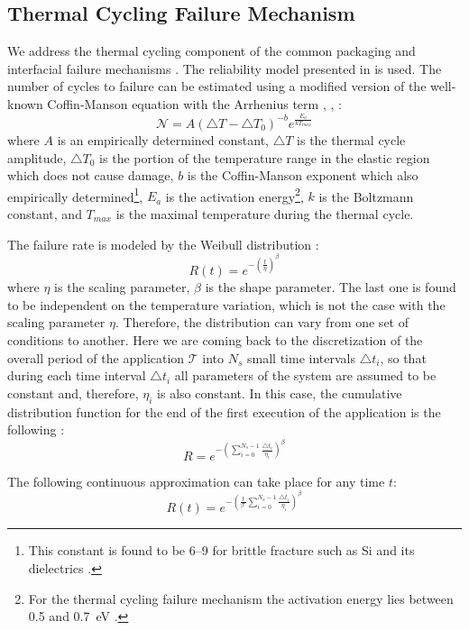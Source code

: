 \subsection{Thermal Cycling Failure Mechanism}
We address the thermal cycling component of the common packaging and interfacial failure mechanisms \cite{jedec2010}. The reliability model presented in \cite{xiang2010} is used. The number of cycles to failure can be estimated using a modified version of the well-known Coffin-Manson equation with the Arrhenius term \cite{jedec2010}, \cite{xiang2010}, \cite{ciappa2003}:
\begin{equation} \label{eq:cycles-to-failure}
  \mathcal{N} = A (\triangle T - \triangle T_0)^{-b} e^{\frac{E_a}{k T_{max}}}
\end{equation}
where $A$ is an empirically determined constant, $\triangle T$ is the thermal cycle amplitude, $\triangle T_0$ is the portion of the temperature range in the elastic region which does not cause damage, $b$ is the Coffin-Manson exponent which also empirically determined\footnote{This constant is found to be 6--9 for brittle fracture such as Si and its dielectrics \cite{jedec2010}.}, $E_{a}$ is the activation energy\footnote{For the thermal cycling failure mechanism the activation energy lies between 0.5 and 0.7~eV \cite{vigrass}.}, $k$ is the Boltzmann constant, and $T_{max}$ is the maximal temperature during the thermal cycle.

The failure rate is modeled by the Weibull distribution \cite{xiang2010}:
\[
  R(t) = e^{-(\frac{t}{\eta})^\beta}
\]
where $\eta$ is the scaling parameter, $\beta$ is the shape parameter. The last one is found to be independent on the temperature variation, which is not the case with the scaling parameter $\eta$. Therefore, the distribution can vary from one set of conditions to another. Here we are coming back to the discretization of the overall period of the application $\mathcal{T}$ into $N_s$ small time intervals $\triangle t_i$, so that during each time interval $\triangle t_i$ all parameters of the system are assumed to be constant and, therefore, $\eta_i$ is also constant. In this case, the cumulative distribution function for the end of the first execution of the application is the following \cite{xiang2010}:
\[
  R = e^{-(\sum_{i=0}^{N_s - 1} \frac{\triangle t_i}{\eta_i})^\beta}
\]

The following continuous approximation can take place for any time $t$:
\[
  R(t) = e^{-(\frac{t}{\mathcal{T}} \sum_{i=0}^{N_s - 1} \frac{\triangle t_i}{\eta_i})^\beta}
\]

